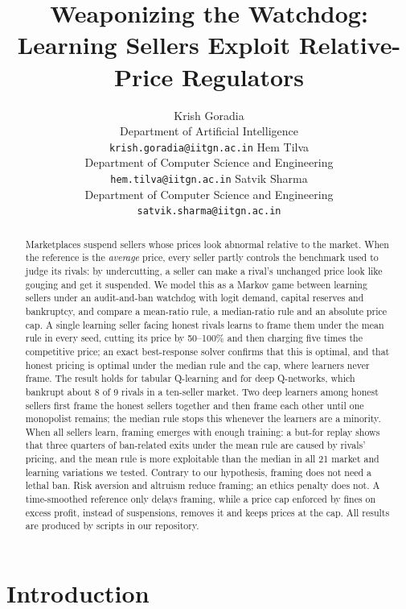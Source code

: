 \documentclass{article}
\title{Weaponizing the Watchdog: Learning Sellers Exploit Relative-Price Regulators}
\author{
  Krish Goradia\\
  Department of Artificial Intelligence\\
  \texttt{krish.goradia@iitgn.ac.in}
  \And
  Hem Tilva\\
  Department of Computer Science and Engineering\\
  \texttt{hem.tilva@iitgn.ac.in}
  \And
  Satvik Sharma\\
  Department of Computer Science and Engineering\\
  \texttt{satvik.sharma@iitgn.ac.in}
}
\date{}
\begin{document}
\maketitle

\begin{abstract}
Marketplaces suspend sellers whose prices look abnormal relative to the market. When the reference is the \emph{average} price, every seller partly controls the benchmark used to judge its rivals: by undercutting, a seller can make a rival's unchanged price look like gouging and get it suspended. We model this as a Markov game between learning sellers under an audit-and-ban watchdog with logit demand, capital reserves and bankruptcy, and compare a mean-ratio rule, a median-ratio rule and an absolute price cap. A single learning seller facing honest rivals learns to frame them under the mean rule in every seed, cutting its price by 50--100\% and then charging five times the competitive price; an exact best-response solver confirms that this is optimal, and that honest pricing is optimal under the median rule and the cap, where learners never frame. The result holds for tabular Q-learning and for deep Q-networks, which bankrupt about 8 of 9 rivals in a ten-seller market. Two deep learners among honest sellers first frame the honest sellers together and then frame each other until one monopolist remains; the median rule stops this whenever the learners are a minority. When all sellers learn, framing emerges with enough training: a but-for replay shows that three quarters of ban-related exits under the mean rule are caused by rivals' pricing, and the mean rule is more exploitable than the median in all 21 market and learning variations we tested. Contrary to our hypothesis, framing does not need a lethal ban. Risk aversion and altruism reduce framing; an ethics penalty does not. A time-smoothed reference only delays framing, while a price cap enforced by fines on excess profit, instead of suspensions, removes it and keeps prices at the cap. All results are produced by scripts in our repository.
\end{abstract}


\section{Introduction}
\end{document}
